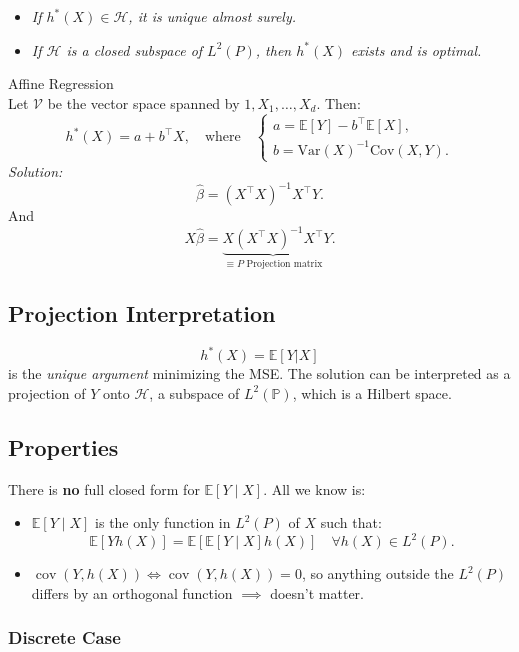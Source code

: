 \begin{prf}
\begin{thm}{}
\begin{itemize}
    \item \textit{If $h^*(X) \in \mathscr{H}$, it is unique almost surely.}
    \item \textit{If $\mathscr{H}$ is a closed subspace of $L^2(P)$, then $h^*(X)$ exists and is optimal.}
\end{itemize}	
\end{thm}


\begin{eg}{Affine Regression}\\
Let $\mathcal{V}$ be the vector space spanned by $1, X_1, \ldots, X_d$. Then:
\[
h^*(X) = a + b^\top X, \quad \text{where} \quad
\begin{cases}
    a = \mathbb{E}[Y] - b^\top \mathbb{E}[X], \\
    b = \text{Var}(X)^{-1} \text{Cov}(X, Y).
\end{cases}
\]
\textit{Solution:} 
\[
\hat{\beta} = (X^\top X)^{-1} X^\top Y.
\]
And 
\[
X\hat{\beta} = \underbrace{X(X^\top X)^{-1} X^\top}_{\equiv P \text{ Projection matrix}} Y.
\]
\end{eg}


\subsection*{Projection Interpretation}
\[
h^*(X) = \mathbb{E}[Y | X]
\]
is the \textit{unique argument} minimizing the MSE. The solution can be interpreted as a projection of $Y$ onto $\mathscr{H}$, a subspace of $L^2(\mathbb{P})$, which is a Hilbert space.

\subsection{Properties}
There is \textbf{no} full closed form for \(\mathbb{E}[Y \mid X]\). All we know is:
\begin{itemize}
    \item \(\mathbb{E}[Y \mid X]\) is the only function in \(L^2(P)\) of \(X\) such that:
    \[
    \mathbb{E}[Yh(X)] = \mathbb{E}[\mathbb{E}[Y \mid X]h(X)] \quad \forall h(X) \in L^2(P).
    \]
    \item \(\operatorname{cov}(Y, h(X)) \iff \operatorname{cov}(Y, h(X)) = 0\), so anything outside the \(L^2(P)\) differs by an orthogonal function \(\implies\) doesn't matter.
\end{itemize}


\subsubsection{Discrete Case}


\end{prf}
